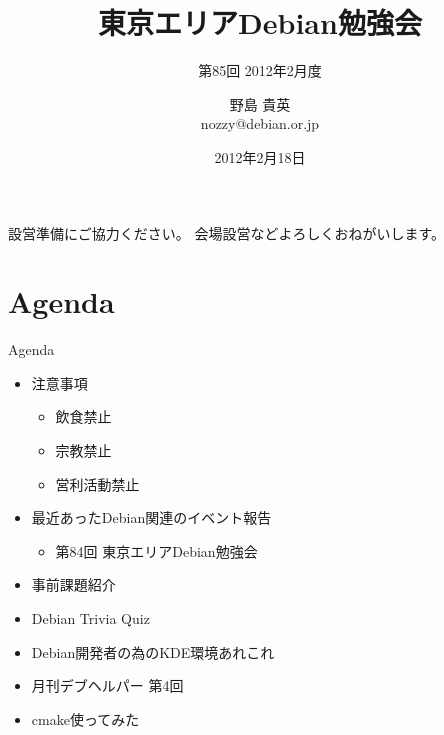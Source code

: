 \title{東京エリアDebian勉強会}
\subtitle{第85回 2012年2月度}
\author{野島 貴英\\nozzy@debian.or.jp}
\date{2012年2月18日}



\frame{\titlepage{}}

\begin{frame}{設営準備にご協力ください。}
会場設営などよろしくおねがいします。
\end{frame}

\section{Agenda}
\begin{frame}{Agenda}
\begin{minipage}[t]{0.45\hsize}
  \begin{itemize}
  \item 注意事項
	\begin{itemize}
	 \item 飲食禁止
	 \item 宗教禁止
	 \item 営利活動禁止
	\end{itemize}
   \item 最近あったDebian関連のイベント報告
	\begin{itemize}
        \item 第84回 東京エリアDebian勉強会
	\end{itemize}
 \end{itemize}
\end{minipage} 
\begin{minipage}[t]{0.45\hsize}
 \begin{itemize}
   \item 事前課題紹介
   \item Debian Trivia Quiz
   \item Debian開発者の為のKDE環境あれこれ
   \item 月刊デブヘルパー 第4回
   \item cmake使ってみた
  \end{itemize}
\end{minipage}
\end{frame}

